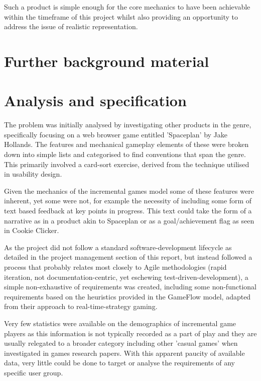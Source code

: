 \documentclass[twoside]{bhamthesis}
\begin{document}
Such a product is simple enough for the core mechanics to have been achievable within the timeframe of this project whilst also providing an opportunity to address the issue of realistic representation.



\section{Further background material}



\section{Analysis and specification}

The problem was initially analysed by investigating other products in the genre, specifically focusing on a web browser game entitled 'Spaceplan' by Jake Hollands. The features and mechanical gameplay elements of these were broken down into simple lists and categorised to find conventions that span the genre. This primarily involved a card-sort exercise, derived from the technique utilised in usability design.

Given the mechanics of the incremental games model some of these features were inherent, yet some were not, for example the necessity of including some form of text based feedback at key points in progress. This text could take the form of a narrative as in a product akin to Spaceplan or as a goal/achievement flag as seen in Cookie Clicker.

As the project did not follow a standard software-development lifecycle as detailed in the project management section of this report, but instead followed a process that probably relates most closely to Agile methodologies (rapid iteration, not documentation-centric, yet eschewing test-driven-development), a simple non-exhaustive of requirements was created, including some non-functional requirements based on the heuristics provided in the GameFlow model, adapted from their approach to real-time-strategy gaming.

Very few statistics were available on the demographics of incremental game players as this information is not typically recorded as a part of play and they are usually relegated to a broader category including other 'casual games' when investigated in games research papers. With this apparent paucity of available data, very little could be done to target or analyse the requirements of any specific user group.
\end{document}
